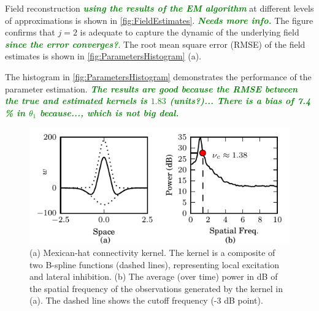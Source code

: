 \documentclass[journal,a4paper]{IEEEtran}
\newcommand{\dean}[1]{\textsf{\emph{\textbf{\textcolor{green}{#1}}}}}
\begin{document}
Field reconstruction \dean{using the results of the EM algorithm} at different levels of approximations is shown in \figurename{\ref{fig:FieldEstimates}}. \dean{Needs more info.} The figure confirms that $j=2$ is adequate to capture the dynamic of the underlying field \dean{since the error converges?}. The root mean square error (RMSE) of the field estimates is shown in \figurename{\ref{fig:ParametersHistogram}} (a). 

The histogram in \figurename{\ref{fig:ParametersHistogram}} demonstrates the performance of the parameter estimation. \dean{The results are good because the RMSE between the true and estimated kernels is $1.83$ (units?)... There is a bias of 7.4 \% in $\theta_1$ because..., which is not big deal.}
\begin{figure}[!h]
 \centering
 \includegraphics[scale=1]{./Graph/ObservationFreqResponse.pdf}
 \caption{(a) Mexican-hat connectivity kernel. The kernel is a composite of two B-spline
functions (dashed lines), representing local excitation and lateral inhibition. (b) The average (over time) power in dB of the spatial frequency of the observations generated by the kernel in (a). The dashed line shows the cutoff frequency (-3 dB point).}
\label{fig:KernelAndFreqResponse} 
  \end{figure} 
\end{document}
